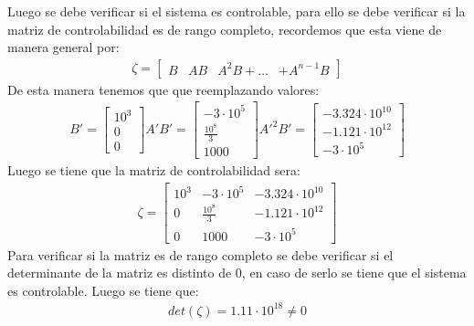 \documentclass[
  11pt,
  letterpaper,
   addpoints,
   answers
  ]{exam}
\begin{document}
\begin{questions}
\begin{solution}
        Luego se debe verificar si el sistema es controlable, para ello se debe verificar si la matriz de controlabilidad es de rango completo, recordemos que esta viene de manera general por:
        \begin{align}
            \zeta =
            \begin{bmatrix}
                 B & AB & A^{2}B + \dots & + A^{n-1}B
            \end{bmatrix}
        \end{align}
        De esta manera tenemos que que reemplazando valores:
        \begin{align}
            B' = 
            \begin{bmatrix}
                10^{3}\\
                0\\
                0
            \end{bmatrix}
            A'B' = 
            \begin{bmatrix}
                -3 \cdot 10^{5}\\
                \frac{10^{8}}{3}\\
                1000
            \end{bmatrix}
            A'^{2}B' = 
            \begin{bmatrix}
                -3.324 \cdot 10^{10}\\
                -1.121 \cdot 10^{12}\\
                -3\cdot 10^{5}
            \end{bmatrix}
        \end{align}
        Luego se tiene que la matriz de controlabilidad sera:
        \begin{align}
            \zeta =
            \begin{bmatrix}
                10^{3} & -3 \cdot 10^{5} & -3.324 \cdot 10^{10}\\
                0 & \frac{10^{8}}{3} & -1.121 \cdot 10^{12}\\
                0 & 1000 & -3\cdot 10^{5}
            \end{bmatrix}
        \end{align}
        Para verificar si la matriz es de rango completo se debe verificar si el determinante de la matriz es distinto de 0, en caso de serlo se tiene que el sistema es controlable. Luego se tiene que:
        \begin{align}
            det(\zeta) = 1.11 \cdot 10^{18} \neq 0
        \end{align}

\end{solution}
\end{questions}
\end{document}
